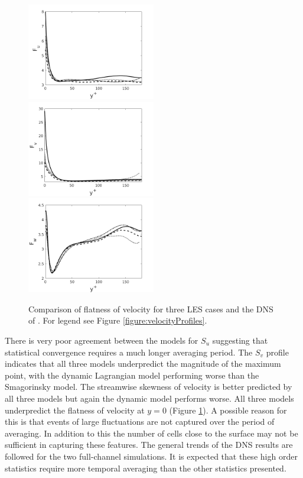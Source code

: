 \documentclass[12pt,oneside,a4paper]{article}
\begin{document}
\begin{figure}[!t]
\centering
\includegraphics[width=0.5\textwidth]{images/F_u.png}\hfill
\includegraphics[width=0.5\textwidth]{images/F_v.png}\\
\includegraphics[width=0.5\textwidth]{images/F_w.png}
\caption{Comparison of flatness of velocity for three LES cases and the DNS of \cite{vreman2014}. For legend see Figure \ref{figure:velocityProfiles}.}
\label{figure:flatness}
\end{figure}


There is very poor agreement between the models for $S_u$ suggesting that statistical convergence requires a much longer averaging period. The $S_v$ profile indicates that all three models underpredict the magnitude of the maximum point, with the dynamic Lagrangian model performing worse than the Smagorinsky model. The streamwise skewness of velocity is better predicted by all three models but again the dynamic model performs worse. All three models underpredict the flatness of velocity at $y=0$ (Figure \ref{figure:flatness}). A possible reason for this is that events of large fluctuations are not captured over the period of averaging. In addition to this the number of cells close to the surface may not be sufficient in capturing these features. The general trends of the DNS results are followed for the two full-channel simulations. It is expected that these high order statistics require more temporal averaging than the other statistics presented. 
\end{document}
